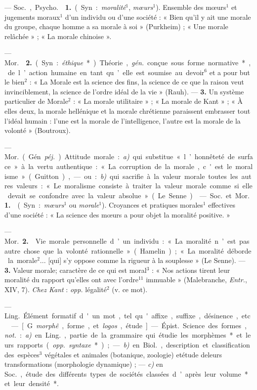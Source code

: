 \begin{itemize}[leftmargin=1cm, label=, itemsep=1pt]
 — \si{Soc.}, \si{Psycho.}  {\bf 1.} (Syn. :
{\it moralité}$^1$, {\it mœurs}$^1$). Ensemble des mœurs$^1$ et jugements
moraux$^1$ d’un
individu ou d’une société : « Bien qu’il y ait une morale du groupe, chaque
homme a sa morale à soi » (Purkheim) ; « Une morale relâchée » ; « La morale
chinoise ».

— \si{Mor.}  {\bf 2.} (Syn. : {\it éthique}*). Théorie,
{\it gén.} conçue sous forme normative*, de l’action humaine en tant qu’elle
est soumise au devoir$^6$ et a pour but le bien$^2$ : « La Morale est la
science des fins, la science de ce que la raison veut invinciblement, la
science de l’ordre idéal de la vie » (Rauh). — {\bf 3.} Un système
particulier de Morale$^2$ : « La morale utilitaire » ; « La morale de
Kant » ; « À elles deux, la morale hellénique et la morale chrétienne
paraissent embrasser tout l'idéal humain : l’une est la morale de
l'intelligence, l’autre est la morale de la volonté » (Boutroux).

 — \si{Mor.} (Gén. {\it péj.}) Attitude morale : {\it a)} qui
substitue « l’honnêteté de surface » à la vertu authentique : « La corruption
de la morale, c'est le moralisme » (Guitton), — ou : {\it b)} qui sacrifie à
la valeur morale toutes les autres valeurs : « Le moralisme consiste à
traiter la valeur morale comme si elle devait se confondre avec la valeur
absolue » (Le Senne).

 — \si{Soc.} et \si{Mor.} {\bf 1.}  (Syn. :
{\it mœurs}$^1$ ou {\it morale}$^1$). Croyances et pratiques morales$^1$
effectives d’une société : « La science des mœurs a pour objet la moralité
positive. »

— \si{Mor.} {\bf 2.}  Vie morale personnelle d’un individu :
« La moralité n’est pas autre chose que la volonté rationnelle » (Hamelin) ;
« La moralité déborde la morale$^2$... [qui] s’y oppose comme la rigueur à la
souplesse » (Le Senne). — {\bf 3.}  Valeur morale; caractère
de ce qui est moral$^3$ : « Nos actions tirent leur
moralité du rapport qu’elles ont avec l’ordre$^{11}$ immuable » (Malebranche,
{\it Entr.}, XIV, 7). {\it Chez Kant} : {\it opp.} légalité$^2$ (v. ce mot).

 — \si{Ling.} Élément formatif d'un mot, tel qu'affixe, suffixe,
désinence, etc.

 — [G. {\it morphê}, forme, et {\it logos}, étude] —
\si{Épist.} Science des formes, {\it not.} : {\it a)} en \si{Ling.}, partie
de la grammaire qui étudie les morphèmes* et leurs rapports ({\it opp.}
{\it syntaxe}*) ; — {\it b)} en \si{Biol.}, description et classification des
espèces$^3$ végétales et animales (botanique, zoologie) etétude deleurs
transformations (morphologie dynamique) ; — {\it c)} en \si{Soc.}, étude des
différents types de sociétés classées d’après leur volume* et leur densité*.


\end{itemize}

